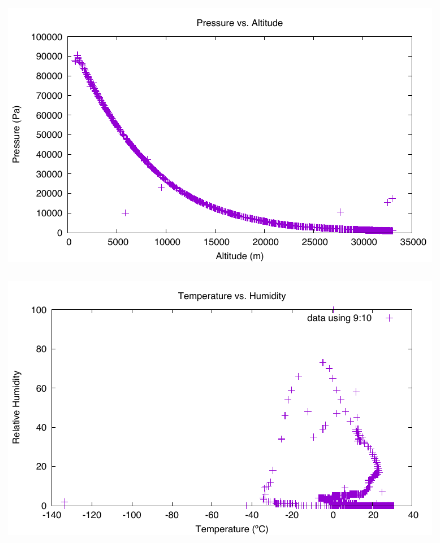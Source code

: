 \documentclass[english]{report}
\begin{document}
\begin{figure}[H]
\begin{centering}
\includegraphics{./tracksoar/pressure-altitude}
\par\end{centering}
\caption{}
\label{ts:pressure-altitude}
\end{figure}

\begin{figure}[H]
\begin{centering}
\includegraphics{./tracksoar/rh-temp}
\par\end{centering}
\caption{}
\label{ts:rh-temp}
\end{figure}
\end{document}
